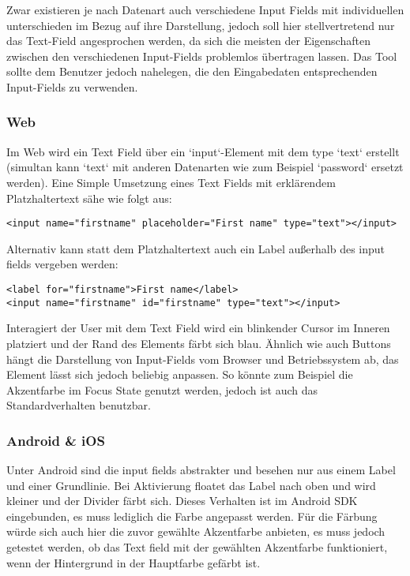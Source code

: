 Zwar existieren je nach Datenart auch verschiedene Input Fields mit individuellen unterschieden im Bezug auf ihre Darstellung, jedoch soll hier stellvertretend nur das Text-Field angesprochen werden, da sich die meisten der Eigenschaften zwischen den verschiedenen Input-Fields problemlos übertragen lassen. Das Tool sollte dem Benutzer jedoch nahelegen, die den Eingabedaten entsprechenden Input-Fields zu verwenden.

\subsubsection{Web}
Im Web wird ein Text Field über ein `input`-Element mit dem type `text` erstellt (simultan kann `text` mit anderen Datenarten wie zum Beispiel `password` ersetzt werden). Eine Simple Umsetzung eines Text Fields mit erklärendem Platzhaltertext sähe wie folgt aus:

\begin{lstlisting}
<input name="firstname" placeholder="First name" type="text"></input>
\end{lstlisting}

Alternativ kann statt dem Platzhaltertext auch ein Label außerhalb des input fields vergeben werden:

\begin{lstlisting}
<label for="firstname">First name</label>
<input name="firstname" id="firstname" type="text"></input>
\end{lstlisting}

Interagiert der User mit dem Text Field wird ein blinkender Cursor im Inneren platziert und der Rand des Elements färbt sich blau.  Ähnlich wie auch Buttons hängt die Darstellung von Input-Fields vom Browser und Betriebssystem ab, das Element lässt sich jedoch beliebig anpassen. So könnte zum Beispiel die Akzentfarbe im Focus State genutzt werden, jedoch ist auch das Standardverhalten benutzbar.


\subsubsection{Android \& iOS}
Unter Android sind die input fields abstrakter und besehen nur aus einem Label und einer Grundlinie. Bei Aktivierung floatet das Label nach oben und wird kleiner und der Divider färbt sich. Dieses Verhalten ist im Android SDK eingebunden, es muss lediglich die Farbe angepasst werden.
Für die Färbung würde sich auch hier die zuvor gewählte Akzentfarbe anbieten, es muss jedoch getestet werden, ob das Text field mit der gewählten Akzentfarbe funktioniert, wenn der Hintergrund in der Hauptfarbe gefärbt ist.

